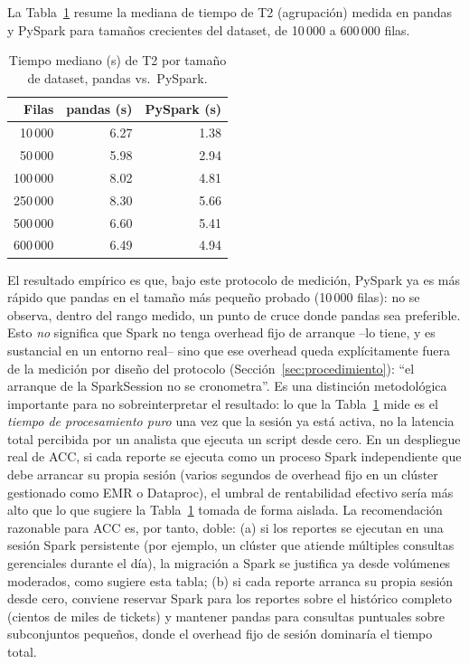 \documentclass[11pt,a4paper]{article}
\begin{document}
La Tabla~\ref{tab:umbral} resume la mediana de tiempo de T2 (agrupaci\'on)
medida en pandas y PySpark para tama\~nos crecientes del dataset, de 10\,000
a 600\,000 filas.

\begin{table}[htbp]
\centering
\caption{Tiempo mediano (s) de T2 por tama\~no de dataset, pandas vs.\ PySpark.}
\label{tab:umbral}
\begin{tabular}{@{}rrr@{}}
\toprule
\textbf{Filas} & \textbf{pandas (\si{\second})} & \textbf{PySpark (\si{\second})} \\
\midrule
10\,000  & 6.27 & 1.38 \\
50\,000  & 5.98 & 2.94 \\
100\,000 & 8.02 & 4.81 \\
250\,000 & 8.30 & 5.66 \\
500\,000 & 6.60 & 5.41 \\
600\,000 & 6.49 & 4.94 \\
\bottomrule
\end{tabular}
\end{table}

El resultado emp\'irico es que, bajo este protocolo de medici\'on, PySpark ya
es m\'as r\'apido que pandas en el tama\~no m\'as peque\~no probado
(10\,000 filas): no se observa, dentro del rango medido, un punto de cruce
donde pandas sea preferible. Esto \emph{no} significa que Spark no tenga
overhead fijo de arranque --lo tiene, y es sustancial en un entorno real--
sino que ese overhead queda expl\'icitamente fuera de la medici\'on por
dise\~no del protocolo (Secci\'on~\ref{sec:procedimiento}): ``el arranque de
la SparkSession no se cronometra''. Es una distinci\'on metodol\'ogica
importante para no sobreinterpretar el resultado: lo que la Tabla~\ref{tab:umbral}
mide es el \emph{tiempo de procesamiento puro} una vez que la sesi\'on ya
est\'a activa, no la latencia total percibida por un analista que ejecuta un
script desde cero. En un despliegue real de ACC, si cada reporte se ejecuta
como un proceso Spark independiente que debe arrancar su propia sesi\'on
(varios segundos de overhead fijo en un cl\'uster gestionado como EMR o
Dataproc), el umbral de rentabilidad efectivo ser\'ia m\'as alto que lo que
sugiere la Tabla~\ref{tab:umbral} tomada de forma aislada. La recomendaci\'on
razonable para ACC es, por tanto, doble: (a) si los reportes se ejecutan en
una sesi\'on Spark persistente (por ejemplo, un cl\'uster que atiende
m\'ultiples consultas gerenciales durante el d\'ia), la migraci\'on a Spark
se justifica ya desde vol\'umenes moderados, como sugiere esta tabla; (b) si
cada reporte arranca su propia sesi\'on desde cero, conviene reservar Spark
para los reportes sobre el hist\'orico completo (cientos de miles de tickets)
y mantener pandas para consultas puntuales sobre subconjuntos peque\~nos,
donde el overhead fijo de sesi\'on dominar\'ia el tiempo total.
\end{document}
